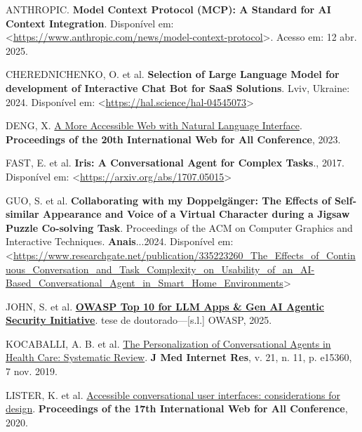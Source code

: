 \documentclass[
]{article}
\newlength{\cslhangindent}
\newenvironment{CSLReferences}[2] %
 {\begin{list}{}{%
  \setlength{\itemindent}{0pt}
  \setlength{\leftmargin}{0pt}
  \setlength{\parsep}{0pt}
  \ifodd #1
   \setlength{\leftmargin}{\cslhangindent}
   \setlength{\itemindent}{-1\cslhangindent}
  \fi
  \setlength{\itemsep}{#2\baselineskip}}}
 {\end{list}}
\begin{document}
\label{refs}
\begin{CSLReferences}{0}{1}
ANTHROPIC. \textbf{Model Context Protocol (MCP): A Standard for AI
Context Integration}. Disponível em:
\textless{}\url{https://www.anthropic.com/news/model-context-protocol}\textgreater.
Acesso em: 12 abr. 2025.

CHEREDNICHENKO, O. et al. \textbf{Selection of Large Language Model for
development of Interactive Chat Bot for SaaS Solutions}. Lviv, Ukraine:
2024. Disponível em:
\textless{}\url{https://hal.science/hal-04545073}\textgreater{}

DENG, X. \href{https://api.semanticscholar.org/CorpusID:258259387}{A
More Accessible Web with Natural Language Interface}.
\textbf{Proceedings of the 20th International Web for All Conference},
2023.

FAST, E. et al. \textbf{Iris: A Conversational Agent for Complex
Tasks}., 2017. Disponível em:
\textless{}\url{https://arxiv.org/abs/1707.05015}\textgreater{}

GUO, S. et al. \textbf{Collaborating with my Doppelgänger: The Effects
of Self-similar Appearance and Voice of a Virtual Character during a
Jigsaw Puzzle Co-solving Task}. Proceedings of the ACM on Computer
Graphics and Interactive Techniques. \textbf{Anais}...2024. Disponível
em:
\textless{}\url{https://www.researchgate.net/publication/335223260_The_Effects_of_Continuous_Conversation_and_Task_Complexity_on_Usability_of_an_AI-Based_Conversational_Agent_in_Smart_Home_Environments}\textgreater{}

JOHN, S. et al.
\textbf{\href{https://genai.owasp.org/llmrisk/llm01-prompt-injection}{OWASP
Top 10 for LLM Apps \& Gen AI Agentic Security Initiative}}. tese de
doutorado---{[}s.l.{]} OWASP, 2025.

KOCABALLI, A. B. et al. \href{https://doi.org/10.2196/15360}{The
Personalization of Conversational Agents in Health Care: Systematic
Review}. \textbf{J Med Internet Res}, v. 21, n. 11, p. e15360, 7 nov.
2019.

LISTER, K. et al.
\href{https://api.semanticscholar.org/CorpusID:218539971}{Accessible
conversational user interfaces: considerations for design}.
\textbf{Proceedings of the 17th International Web for All Conference},
2020.


\end{CSLReferences}
\end{document}
